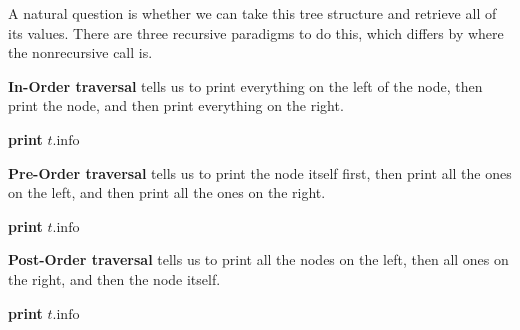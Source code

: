   A natural question is whether we can take this tree structure and retrieve all of its values. There are three recursive paradigms to do this, which differs by where the nonrecursive call is. 

  \begin{algo}
    \textbf{In-Order traversal} tells us to print everything on the left of the node, then print the node, and then print everything on the right. 
    \begin{algorithmic}[1]
        \State {}
        \State \textbf{print} $t.\text{info}$
        \State {}
      \EndIf
    \EndProcedure
    \end{algorithmic}
  \end{algo}

  \begin{algo}
    \textbf{Pre-Order traversal} tells us to print the node itself first, then print all the ones on the left, and then print all the ones on the right. 
    \begin{algorithmic}[1]
        \State \textbf{print} $t.\text{info}$
        \State {}
        \State {}
      \EndIf
    \EndProcedure
    \end{algorithmic}
  \end{algo}

  \begin{algo}
    \textbf{Post-Order traversal} tells us to print all the nodes on the left, then all ones on the right, and then the node itself. 
    \begin{algorithmic}[1]
        \State {}
        \State {}
        \State \textbf{print} $t.\text{info}$
      \EndIf
    \EndProcedure
    \end{algorithmic}
  \end{algo} 

